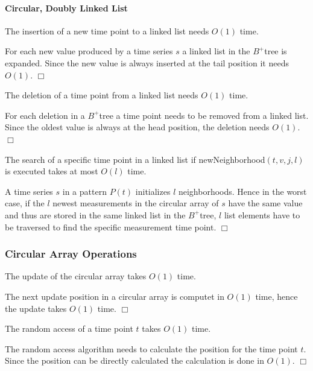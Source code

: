 \documentclass[abstracton,12pt,oneside]{scrreprt}
\newenvironment{proof}
  {\noindent{\bf Proof:\rm}}{\hfill$\Box$\vspace{\medskipamount}}
\begin{document}
\paragraph{Circular, Doubly Linked List}
\begin{mydef}
	The insertion of a new time point to a linked list needs $O(1)$ time.
\end{mydef}
\begin{proof}
	For each new value produced by a time series $s$ a linked list in the $B^+$tree is expanded. Since the new value is always inserted at the tail position it needs $O(1)$.
\end{proof}
\begin{mydef}
	The deletion of a time point from a linked list needs $O(1)$ time.
\end{mydef}
\begin{proof}
	For each deletion in a $B^+$tree a time point needs to be removed from a linked list. Since the oldest value is always at the head position, the deletion needs $O(1)$.
\end{proof}
\begin{mydef}
	The search of a specific time point in a linked list if newNeighborhood$(t,v,j,l)$ is executed takes at most $O(l)$ time.
\end{mydef}
\begin{proof}
	A time series $s$ in a pattern $P(t)$ initializes $l$ neighborhoods. Hence in the worst case, if the $l$ newest measurements in the circular array of $s$ have the same value and thus are stored in the same linked list in the $B^+$tree, $l$ list elements have to be traversed to find the specific measurement time point. 
\end{proof}

\subsubsection{Circular Array Operations}
\begin{mydef}
	The update of the circular array takes $O(1)$ time.
\end{mydef}
\begin{proof}
	The next update position in a circular array is computet in $O(1)$ time, hence the update takes $O(1)$ time. 
\end{proof}
\begin{mydef}
	The random access of a time point $t$ takes $O(1)$ time.
\end{mydef}
\begin{proof}
	The random access algorithm needs to calculate the position for the time point $t$. Since the position can be directly calculated the calculation is done in $O(1)$.
\end{proof}
\end{document}
